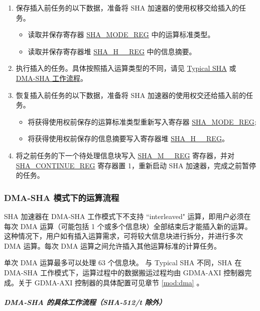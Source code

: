 \documentclass[main\_\_CN.tex]{subfiles}
\begin{document}
\begin{enumerate}
    \item 保存插入前任务的以下数据，准备将 SHA 加速器的使用权移交给插入的任务。
        \begin{itemize}
            \item 读取并保存寄存器 \hyperref[regdesc:SHAMODEREG]{SHA\_MODE\_REG} 中的运算标准类型。
            \item 读取并保存寄存器堆 \hyperref[regdesc:SHAHNREG]{SHA\_H\_\_REG} 中的信息摘要。
        \end{itemize}
    \item 执行插入的任务。具体按照插入运算类型的不同，请见 \hyperref[sec:sha-typical-sha]{Typical SHA} 或 \hyperref[sec:sha-dma-sha]{DMA-SHA 工作流程}。
    \item 恢复插入前任务的以下数据，准备将 SHA 加速器的使用权交还给插入前的任务。
        \begin{itemize}
            \item 将获得使用权前保存的运算标准类型重新写入寄存器 \hyperref[regdesc:SHAMODEREG]{SHA\_MODE\_REG};
            \item 将获得使用权前保存的信息摘要写入寄存器堆 \hyperref[regdesc:SHAHNREG]{SHA\_H\_\_REG}。
        \end{itemize}
    \item 将之前任务的下一个待处理信息块写入 \hyperref[regdesc:SHAMNREG]{SHA\_M\_\_REG} 寄存器，并对 \hyperref[regdesc:SHACONTINUEREG]{SHA\_CONTINUE\_REG} 寄存器置 1，重新启动 SHA 加速器，完成之前暂停的任务。
\end{enumerate}


\subsubsection{DMA-SHA 模式下的运算流程}\label{sec:sha-dma-sha}

\chipname{} SHA 加速器在 DMA-SHA 工作模式下不支持 ``interleaved" 运算，即用户必须在每次 DMA 运算（可能包括 1 个或多个信息块）全部结束后才能插入新的运算。这种情况下，用户如有插入运算需求，可将较大信息块进行拆分，并进行多次 DMA 运算。每次 DMA 运算之间允许插入其他运算标准的计算任务。

单次 DMA 运算最多可以处理 63 个信息块。
与 Typical SHA 不同，SHA 在 DMA-SHA 工作模式下，运算过程中的数据搬运过程均由 GDMA-AXI 控制器完成。关于 GDMA-AXI 控制器的具体配置可见章节 \ref{mod:dma} \textit{}。

\subparagraph{DMA-SHA 的具体工作流程（SHA-512/{\it{t}} 除外）}
\end{document}
